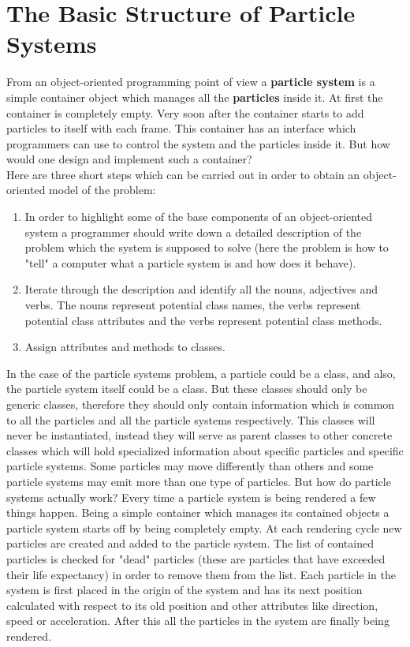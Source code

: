 \section{The Basic Structure of Particle Systems}
From an object-oriented programming point of view a \textbf{particle system} is a simple container object which manages all the \textbf{particles} inside it. At first the container is completely empty. Very soon after the container starts to add particles to itself with each frame. This container has an interface which programmers can use to control the system and the particles inside it. But how would one design and implement such a container?\\

Here are three short steps which can be carried out in order to obtain an object-oriented model of the problem:
\begin{enumerate}
	\item In order to highlight some of the base components of an object-oriented system a programmer should write down a detailed description of the problem which the system is supposed to solve (here the problem is how to "tell" a computer what a particle system is and how does it behave).
	
	\item Iterate through the description and identify all the nouns, adjectives and verbs. The nouns represent potential class names, the verbs represent potential class attributes and the verbs represent potential class methods.
	
	\item Assign attributes and methods to classes.
\end{enumerate}

\newpage
In the case of the particle systems problem, a particle could be a class, and also, the particle system itself could be a class. But these classes should only be generic classes, therefore they should only contain information which is common to all the particles and all the particle systems respectively. This classes will never be instantiated, instead they will serve as parent classes to other concrete classes which will hold specialized information about specific particles and specific particle systems. Some particles may move differently than others and some particle systems may emit more than one type of particles. But how do particle systems actually work? Every time a particle system is being rendered a few things happen. Being a simple container which manages its contained objects a particle system starts off by being completely empty. At each rendering cycle new particles are created and added to the particle system. The list of contained particles is checked for "dead" particles (these are particles that have exceeded their life expectancy) in order to remove them from the list. Each particle in the system is first placed in the origin of the system and has its next position calculated with respect to its old position and other attributes like direction, speed or acceleration. After this all the particles in the system are finally being rendered.\\

